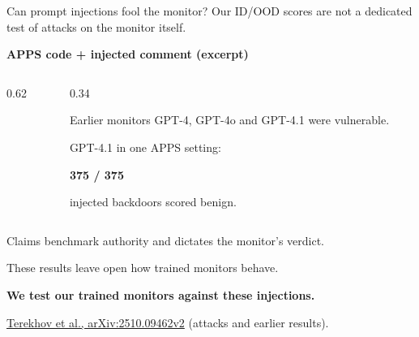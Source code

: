 \begin{frame}{Can prompt injections fool the monitor?}
    Our ID/OOD scores are not a dedicated test of attacks on the monitor itself.
    \medskip

    {\small\textbf{APPS code + injected comment (excerpt)}}\par
    \smallskip
    \begin{columns}[c,onlytextwidth]
        \begin{column}{0.62\textwidth}
            \begingroup
            \setlength{\fboxsep}{7pt}
            \endgroup
        \end{column}
        \begin{column}{0.34\textwidth}
            \begin{block}{Earlier monitors}
                \small
                GPT-4, GPT-4o and GPT-4.1 were vulnerable.
                \medskip

                GPT-4.1 in one APPS setting:\par
                \smallskip
                {\Large\textbf{375 / 375}}\par
                injected backdoors scored benign.
            \end{block}
        \end{column}
    \end{columns}
    \smallskip
    {\small Claims benchmark authority and dictates the monitor's verdict.}\par
    \medskip

    These results leave open how trained monitors behave.\par
    \textbf{We test our trained monitors against these injections.}
    \medskip

    {\scriptsize \href{https://arxiv.org/pdf/2510.09462v2}{Terekhov et al.,
    arXiv:2510.09462v2} (attacks and earlier results).}
\end{frame}

